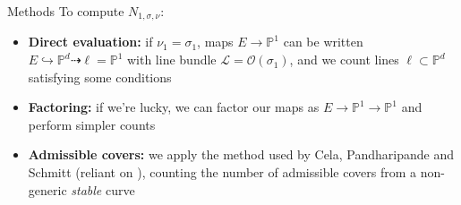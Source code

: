 \documentclass{beamer}
\renewcommand{\P}{\mathbb P}
\theoremstyle{definition}
\begin{document}
                                                                                                                                                                                                                          \begin{frame}{Methods}
                                                                                                                                                                                                                            To compute $N_{1,\sigma,\nu}$:
                                                                                                                                                                                                                            \begin{itemize}
                                                                                                                                                                                                                            \item {\bf Direct evaluation:} if $\nu_1=\sigma_1$, maps $E\to\P^1$ can be written $E\hookrightarrow\P^d\dashrightarrow \ell=\P^1$
                                                                                                                                                                                                                              with line bundle $\mathcal L=\mathcal O(\sigma_1)$,
                                                                                                                                                                                                                              and we count lines $\ell\subset\P^d$ satisfying some conditions
                                                                                                                                                                                                                            \item {\bf Factoring:} if we're lucky, we can factor our maps as $E\to\P^1\to\P^1$ and perform simpler counts
                                                                                                                                                                                                                            \item {\bf Admissible covers:} we apply the method used by Cela, Pandharipande and Schmitt \cite{Cela} (reliant on \cite{Lian}), counting the number of admissible covers from a non-generic
                                                                                                                                                                                                                              {\it stable} curve
                                                                                                                                                                                                                            \end{itemize}


\end{frame}
\end{document}
